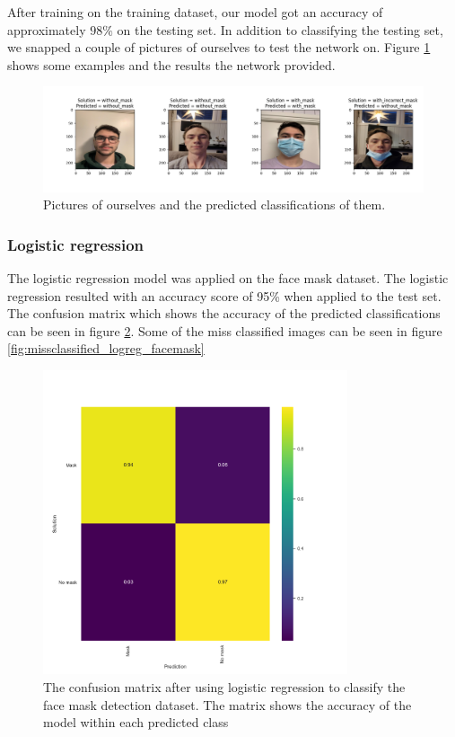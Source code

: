 \documentclass[../main.tex]{subfiles}
\begin{document}
After training on the training dataset, our model got an accuracy of approximately $98\%$ on the testing set. In addition to classifying the testing set, we snapped a couple of pictures of ourselves to test the network on. Figure \ref{fig:cnn_real_pics_predictions} shows some examples and the results the network provided.

\begin{figure}[H]
    \centering
    \includegraphics[width=\textwidth]{assets/cnn_real_pics_predictions.png}
    \caption{Pictures of ourselves and the predicted classifications of them.}
    \label{fig:cnn_real_pics_predictions}
\end{figure}


\subsubsection{Logistic regression}
The logistic regression model was applied on the face mask dataset. The logistic regression resulted with an accuracy score of 95\% when applied to the test set. The confusion matrix which shows the accuracy of the predicted classifications can be seen in figure \ref{fig:logreg_facemask_cm}. Some of the miss classified images can be seen in figure \ref{fig:missclassified_logreg_facemask}

\begin{figure}[H]
    \centering
    \includegraphics[width=0.8\textwidth]{assets/logreg_mask_heatmap_accuracy95.png}
    \caption{The confusion matrix after using logistic regression to classify the face mask detection dataset. The matrix shows the accuracy of the model within each predicted class}
    \label{fig:logreg_facemask_cm}
\end{figure}
\end{document}

